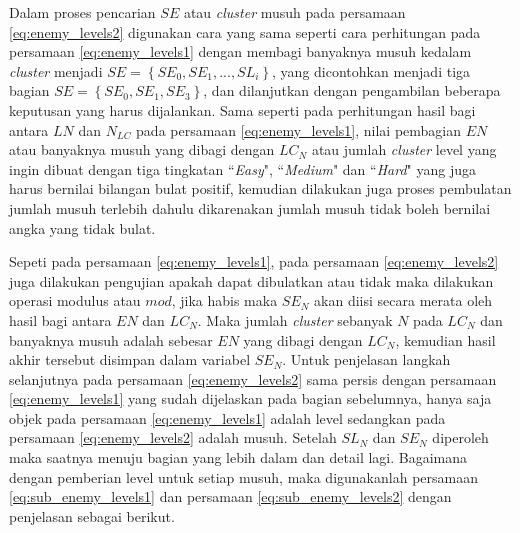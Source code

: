 Dalam proses pencarian $SE$ atau \textit{cluster} musuh pada persamaan \ref{eq:enemy_levels2} digunakan cara yang sama seperti cara perhitungan pada persamaan \ref{eq:enemy_levels1} dengan membagi banyaknya musuh kedalam \textit{cluster} menjadi $SE = \left \{SE_{0}, SE_{1},... , SL_{i} \right\}$, yang dicontohkan menjadi tiga bagian $SE = \left \{SE_{0}, SE_{1}, SE_{3} \right \}$, dan dilanjutkan dengan pengambilan beberapa keputusan yang harus dijalankan. Sama seperti pada perhitungan hasil bagi antara $LN$ dan $N_{LC}$ pada persamaan \ref{eq:enemy_levels1}, nilai pembagian $EN$ atau banyaknya musuh yang dibagi dengan $LC_{N}$ atau jumlah \textit{cluster} level yang ingin dibuat dengan tiga tingkatan ``\textit{Easy}", ``\textit{Medium}" dan ``\textit{Hard}" yang juga harus bernilai bilangan bulat positif, kemudian dilakukan juga proses pembulatan jumlah musuh terlebih dahulu dikarenakan jumlah musuh tidak boleh bernilai angka yang tidak bulat. 
\vspace{1ex}

Sepeti pada persamaan \ref{eq:enemy_levels1}, pada persamaan \ref{eq:enemy_levels2} juga dilakukan pengujian apakah dapat dibulatkan atau tidak maka dilakukan operasi modulus atau $mod$, jika habis maka $SE_{N}$ akan diisi secara merata oleh hasil bagi antara $EN$ dan $LC_{N}$. Maka jumlah \textit{cluster} sebanyak $N$ pada $LC_{N}$ dan banyaknya musuh adalah sebesar $EN$ yang dibagi dengan $LC_{N}$, kemudian hasil akhir tersebut disimpan dalam variabel $SE_{N}$. Untuk penjelasan langkah selanjutnya pada persamaan \ref{eq:enemy_levels2} sama persis dengan persamaan \ref{eq:enemy_levels1} yang sudah dijelaskan pada bagian sebelumnya, hanya saja objek pada persamaan \ref{eq:enemy_levels1} adalah level sedangkan pada persamaan \ref{eq:enemy_levels2} adalah musuh. Setelah $SL_{N}$ dan $SE_{N}$ diperoleh maka saatnya menuju bagian yang lebih dalam dan detail lagi. Bagaimana dengan pemberian level untuk setiap musuh, maka digunakanlah persamaan \ref{eq:sub_enemy_levels1} dan persamaan \ref{eq:sub_enemy_levels2} dengan penjelasan sebagai berikut.
\vspace{1ex}

